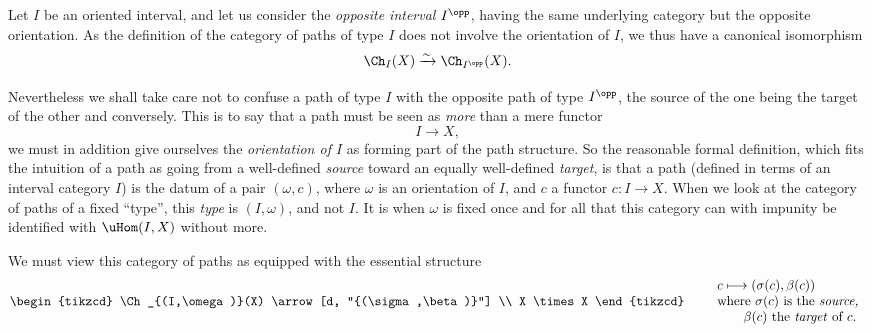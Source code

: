 Let $I$ be an oriented interval, and let us consider the \textit{opposite interval $I^{\opp}$}, having the same underlying category but the opposite orientation. As the definition of the category of paths of type $I$ does not involve the orientation of $I$, we thus have a canonical isomorphism %
\[
\Ch_I(X) \xrightarrow{\sim} \Ch_{I^{\opp}}(X).
\]


Nevertheless we shall take care not to confuse a path of type $I$ with the opposite path of type $I^{\opp}$, the source of the one being the target of the other and conversely. This is to say that a path must be seen as \textit{more} than a mere functor
\[
I \longrightarrow X,
\]
we must in addition give ourselves the \textit{orientation of $I$} as forming part of the path structure. So the reasonable formal definition, which fits the intuition of a path as going from a well-defined \textit{source} toward an equally well-defined \textit{target}, is that a path (defined in terms of an interval category $I$) is the datum of a pair $(\omega,c)$, where $\omega$ is an orientation of $I$, and $c$ a functor $c : I \longrightarrow X$. When we look at the category of paths of a fixed ``type'', this \textit{type} is $(I,\omega)$, and not $I$. It is when $\omega$ is fixed once and for all that this category can with impunity be identified with $\uHom(I,X)$ without more. %

We must view this category of paths as equipped with the essential structure
\[
\begin{tikzcd}
\Ch_{(I,\omega)}(X) \arrow[d, "{(\sigma,\beta)}"] \\
X \times X
\end{tikzcd}
\qquad
\begin{array}{l}
c \longmapsto (\sigma(c),\beta(c)) \\
\text{where $\sigma(c)$ is the \textit{source,}} \\
\qquad \text{$\beta(c)$ the \textit{target} of $c$.}
\end{array} %
\]



